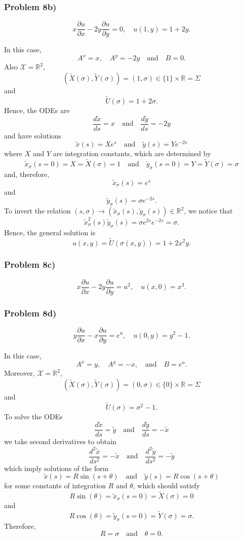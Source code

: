 \documentclass[11pt,spanish]{article}
\newcommand{\RR}{\mathbb{R}}
\begin{document}
\subsubsection{Problem 8b)}

$$
\displaystyle x\frac{\partial u}{\partial x} - 2y\frac{\partial u}{\partial y} = 0,\quad u(1,y)=1+2y.
$$

In this case, 
$$
A^x = x,
\quad
A^y = -2y
\quad
\text{and}
\quad
B = 0.
$$
Also $\mathcal X = \RR^2$,
$$
(\tilde X(\sigma),\tilde Y(\sigma))
=
(1,\sigma)
\in 
\{1\}\times \RR
=
\Sigma
$$
and
$$
\tilde U(\sigma)
=
1+2\sigma.
$$
Hence, the ODEs are
$$
\frac{d\tilde x}{ds}
=
x
\quad
\text{and}
\quad
\frac{d\tilde y}{ds}
=
-2y
$$
and have solutions
$$
\tilde x(s)
=
X e^{s}
\quad
\text{and}
\quad
\tilde y(s)
=
Y e^{-2s}
$$
where $X$ and $Y$ are integration constants, which are determined by
$$
\tilde x_{\sigma}(s=0)
=
X
=
\tilde X(\sigma) = 1
\quad
\text{and}
\quad
\tilde y_{\sigma}(s=0)
=
Y
=
\tilde Y(\sigma) = \sigma
$$
and, therefore,
$$
\tilde x_{\sigma}(s)
=
e^s
$$
and
$$
\tilde y_{\sigma}(s)
=
\sigma e^{-2s}
.
$$
To invert the relation $(s,\sigma) \to  (\tilde x_{\sigma}(s),\tilde y_{\sigma}(s))\in \RR^2$, we notice that
$$
\tilde x^2_{\sigma}(s)
\tilde y_{\sigma}(s)
=
\sigma e^{2s} e^{-2s}
=
\sigma.
$$
Hence, the general solution is
$$
u(x,y)
=
\tilde U(\sigma(x,y))
=
1 + 2x^2y.
$$

\subsubsection{Problem 8c)}

$$
\displaystyle x\frac{\partial u}{\partial x} - 2y\frac{\partial u}{\partial y} = u^2,\quad u(x,0)=x^3.
$$

\subsubsection{Problem 8d)}

$$
\displaystyle y\frac{\partial u}{\partial x} - x\frac{\partial u}{\partial y} = e^{u},\quad u(0,y)=y^2-1.
$$

In this case,
$$
A^x
=
y,
\quad
A^y
=
-x,
\quad
\text{and}
\quad
B = e^u.
$$
Moreover, $\mathcal X=\RR^2$,
$$
(\tilde X(\sigma),\tilde Y(\sigma)) 
= 
(0,\sigma)
\in
\{0\}\times \RR
=
\Sigma
$$
and
$$
\tilde U(\sigma)
=
\sigma^2 - 1.
$$
To solve the ODEs
$$
\frac{d\tilde x}{ds}
=
\tilde y
\quad
\text{and}
\quad
\frac{d\tilde y}{ds}
=
-
\tilde x
$$
we take second derivatives to obtain
$$
\frac{d^2 \tilde x}{ds^2}
=
-
\tilde x
\quad
\text{and}
\quad
\frac{d^2 \tilde y}{ds^2}
=
-
\tilde y
$$
which imply solutions of the form
$$
\tilde x(s)
=
R\sin(s+\theta)
\quad
\text{and}
\quad
\tilde y(s)
=
R\cos(s+\theta)
$$
for some constants of integration $R$ and $\theta$, which should satisfy
$$
R\sin(\theta)
=
\tilde x_{\sigma}(s=0)
=
\tilde X(\sigma)
=
0
$$
and
$$
R\cos(\theta)
=
\tilde y_{\sigma}(s=0)
=
\tilde Y(\sigma)
=
\sigma.
$$
Therefore,
$$
R=\sigma
\quad
\text{and}
\quad
\theta=0.
$$
\end{document}
